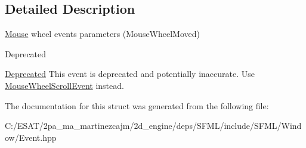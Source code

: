\subsection{Detailed Description}
\hyperlink{classsf_1_1_mouse}{Mouse} wheel events parameters (Mouse\+Wheel\+Moved) 

\begin{DoxyRefDesc}{Deprecated}
\item[\hyperlink{deprecated__deprecated000019}{Deprecated}]This event is deprecated and potentially inaccurate. Use \hyperlink{structsf_1_1_event_1_1_mouse_wheel_scroll_event}{Mouse\+Wheel\+Scroll\+Event} instead.\end{DoxyRefDesc}


The documentation for this struct was generated from the following file\+:\begin{DoxyCompactItemize}
\item 
C\+:/\+E\+S\+A\+T/2pa\+\_\+ma\+\_\+martinezcajm/2d\+\_\+engine/deps/\+S\+F\+M\+L/include/\+S\+F\+M\+L/\+Window/Event.\+hpp\end{DoxyCompactItemize}
